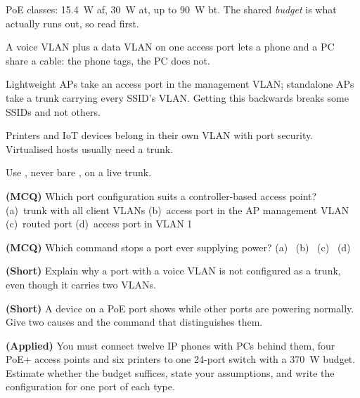 \begin{chaptersummary}
\begin{tight}
  \item PoE classes: 15.4~W af, 30~W at, up to 90~W bt. The shared \emph{budget}
        is what actually runs out, so read  first.
  \item A voice VLAN plus a data VLAN on one access port lets a phone and a PC
        share a cable: the phone tags, the PC does not.
  \item Lightweight APs take an access port in the management VLAN; standalone
        APs take a trunk carrying every SSID's VLAN. Getting this backwards
        breaks some SSIDs and not others.
  \item Printers and IoT devices belong in their own VLAN with port security.
        Virtualised hosts usually need a trunk.
  \item Use , never bare , on a live trunk.
\end{tight}
\end{chaptersummary}

\begin{reviewq}
  \item \textbf{(MCQ)} Which port configuration suits a controller-based access
        point? (a)~trunk with all client VLANs (b)~access port in the AP
        management VLAN (c)~routed port (d)~access port in VLAN 1
  \item \textbf{(MCQ)} Which command stops a port ever supplying power?
        (a)~ (b)~
        (c)~ (d)~
  \item \textbf{(Short)} Explain why a port with a voice VLAN is not configured
        as a trunk, even though it carries two VLANs.
  \item \textbf{(Short)} A device on a PoE port shows  while other
        ports are powering normally. Give two causes and the command that
        distinguishes them.
  \item \textbf{(Applied)} You must connect twelve IP phones with PCs behind
        them, four PoE+ access points and six printers to one 24-port switch with
        a 370~W budget. Estimate whether the budget suffices, state your
        assumptions, and write the configuration for one port of each type.
\end{reviewq}
